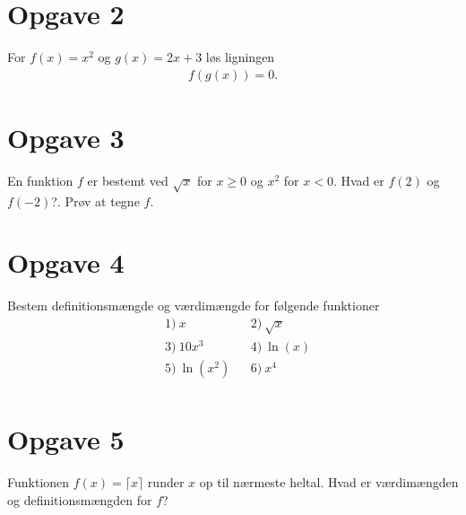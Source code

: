 \section*{Opgave 2}
For $f(x) = x^2$ og $g(x)=2x+3$ løs ligningen
\begin{align*}
f(g(x)) = 0.
\end{align*}
\section*{Opgave 3}
En funktion $f$ er bestemt ved $\sqrt{x}$ for $x\geq 0$ og $x^2$ for $x<0$. Hvad er $f(2)$ og $f(-2)$?. Prøv at tegne $f$. 
\section*{Opgave 4}
Bestem definitionsmængde og værdimængde for følgende funktioner
\begin{align*}
&1) \ x  &&2) \ \sqrt{x}  \\
&3) \ 10x^3  &&4) \ \ln(x)  \\
&5) \  \ln(x^2) &&6) \ x^4   \\
\end{align*}
\section*{Opgave 5}
Funktionen $f(x) = \lceil x \rceil$ runder $x$ op til nærmeste heltal. Hvad er værdimængden og definitionsmængden for $f$?